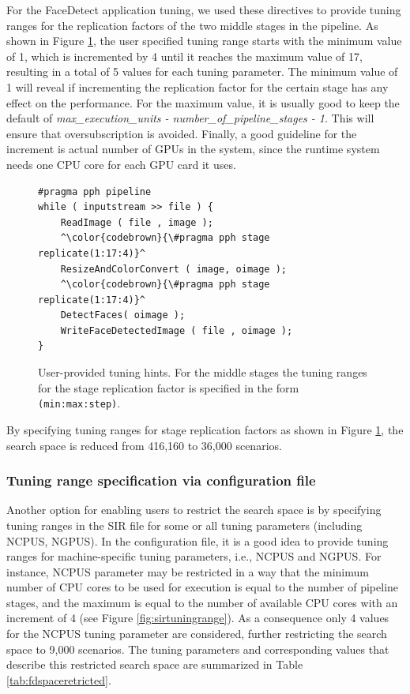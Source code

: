 For the FaceDetect application tuning, we used these directives to provide tuning ranges for the replication factors of the two middle stages in the pipeline. As shown in Figure \ref{fig:tuningrange}, the user specified tuning range starts with the minimum value of 1, which is incremented by 4 until it reaches the maximum value of 17, resulting in a total of 5 values for each tuning parameter. The minimum value of 1 will reveal if incrementing the replication factor for the certain stage has any effect on the performance. For the maximum value, it is usually good to keep the default of \textit{max\_execution\_units - number\_of\_pipeline\_stages - 1}. This will ensure that oversubscription is avoided. Finally, a good guideline for the increment is actual number of GPUs in the system, since the runtime system needs one CPU core for each GPU card it uses.   
 
\begin{figure}[htb]
\centering
\begin{lstlisting}
#pragma pph pipeline
while ( inputstream >> file ) {
    ReadImage ( file , image );
    ^\color{codebrown}{\#pragma pph stage replicate(1:17:4)}^
    ResizeAndColorConvert ( image, oimage );
    ^\color{codebrown}{\#pragma pph stage replicate(1:17:4)}^
    DetectFaces( oimage );
    WriteFaceDetectedImage ( file , oimage );
}
\end{lstlisting}
\caption{User-provided tuning hints. For the middle stages the tuning ranges for the stage replication factor is specified in  the form {\tt (min:max:step)}.}
\label{fig:tuningrange}
\end{figure}

By specifying tuning ranges for stage replication factors as shown in Figure \ref{fig:tuningrange}, the search space is reduced from 416,160 to 36,000 scenarios.

\subsubsection{Tuning range specification via configuration file}
Another option for enabling users to restrict the search space is by specifying tuning ranges in the SIR file for some or all tuning parameters (including NCPUS, NGPUS). 
In the configuration file, it is a good idea to provide tuning ranges for machine-specific tuning parameters, i.e., NCPUS and NGPUS. For instance, NCPUS parameter may be restricted in a way that the minimum number of CPU cores to be used for execution is equal to the number of pipeline stages, and the maximum is equal to the number of available CPU cores with an increment of 4 (see Figure \ref{fig:sirtuningrange}). As a consequence only 4 values for the NCPUS tuning parameter are considered, further restricting the search space to 9,000 scenarios. The tuning parameters and corresponding values that describe this restricted search space are summarized in Table \ref{tab:fdspaceretricted}.   

